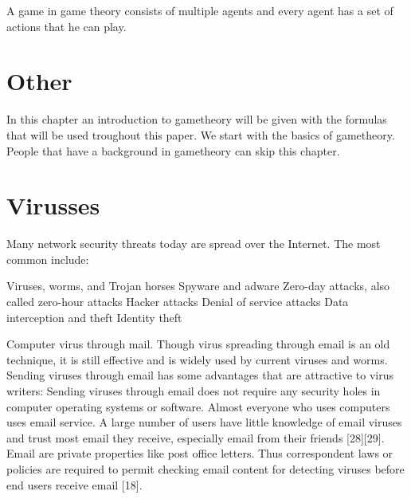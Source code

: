 A game in game theory consists of multiple agents and every agent has a set of actions that he can play. 








\section{Other}
In this chapter an introduction to gametheory will be given with the formulas that will be used troughout this paper. We start with the basics of gametheory. People that have a background in gametheory can skip this chapter.
\section{Virusses}

Many network security threats today are spread over the Internet. The most common include:

Viruses, worms, and Trojan horses
Spyware and adware
Zero-day attacks, also called zero-hour attacks
Hacker attacks
Denial of service attacks
Data interception and theft
Identity theft


Computer virus through mail. 
Though virus spreading through email is an old technique, it is still effective and is widely used by
current viruses and worms. Sending viruses through email has some advantages that are attractive to
virus writers:
 Sending viruses through email does not require any security holes in computer operating systems
or software.
 Almost everyone who uses computers uses email service.
 A large number of users have little knowledge of email viruses and trust most email they receive,
especially email from their friends [28][29].
 Email are private properties like post office letters. Thus correspondent laws or policies are required
to permit checking email content for detecting viruses before end users receive email [18].

